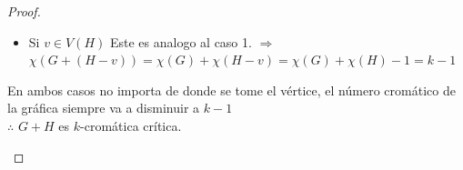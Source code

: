 \documentclass{article}
\begin{document}
\begin{enumerate}
\begin{proof}
\begin{itemize}
\begin{itemize}
       \item Si $v \in V(H)$
         Este es analogo al caso 1.
         $\Longrightarrow$ $\chi(G+(H-v)) = \chi(G) + \chi(H-v) = \chi(G) + \chi(H) - 1 = k-1$
       \end{itemize}
       En ambos casos no importa de donde se tome el vértice, el número cromático de la gráfica siempre va a disminuir a $k-1$ \\
       $\therefore$ $G+H$ es $k$-cromática crítica. \\
    \end{itemize}
  \end{proof}
\end{enumerate}
\end{document}
